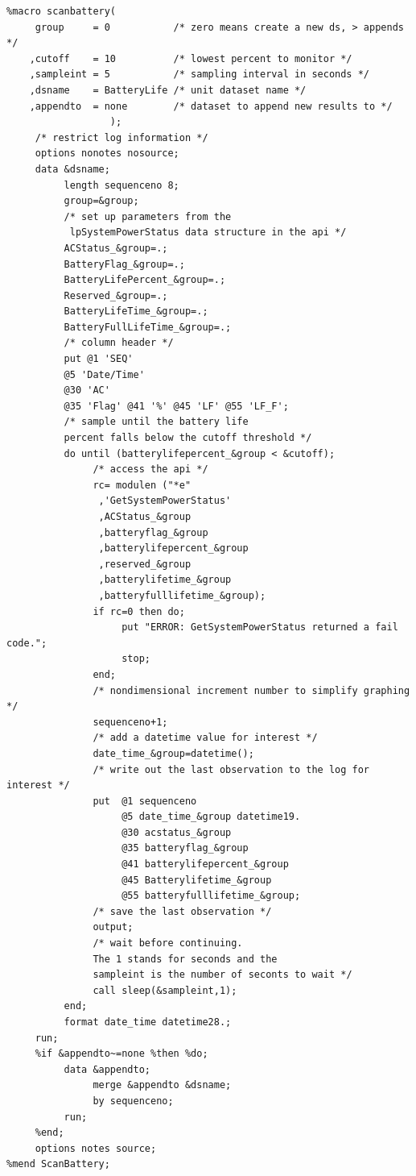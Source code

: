 \documentclass{sugconf}
\begin{document}
\begin{verbatim}
%macro scanbattery(
     group     = 0           /* zero means create a new ds, > appends */
    ,cutoff    = 10          /* lowest percent to monitor */
    ,sampleint = 5           /* sampling interval in seconds */
    ,dsname    = BatteryLife /* unit dataset name */
    ,appendto  = none        /* dataset to append new results to */
                  );
     /* restrict log information */
     options nonotes nosource;
     data &dsname;
          length sequenceno 8;
          group=&group;
          /* set up parameters from the
           lpSystemPowerStatus data structure in the api */
          ACStatus_&group=.;
          BatteryFlag_&group=.;
          BatteryLifePercent_&group=.;
          Reserved_&group=.;
          BatteryLifeTime_&group=.;
          BatteryFullLifeTime_&group=.;
          /* column header */
          put @1 'SEQ'
          @5 'Date/Time'
          @30 'AC'
          @35 'Flag' @41 '%' @45 'LF' @55 'LF_F';
          /* sample until the battery life
          percent falls below the cutoff threshold */
          do until (batterylifepercent_&group < &cutoff);
               /* access the api */
               rc= modulen ("*e"
                ,'GetSystemPowerStatus'
                ,ACStatus_&group
                ,batteryflag_&group
                ,batterylifepercent_&group
                ,reserved_&group
                ,batterylifetime_&group
                ,batteryfulllifetime_&group);
               if rc=0 then do;
                    put "ERROR: GetSystemPowerStatus returned a fail code.";
                    stop;
               end;
               /* nondimensional increment number to simplify graphing */
               sequenceno+1;
               /* add a datetime value for interest */
               date_time_&group=datetime();
               /* write out the last observation to the log for interest */
               put  @1 sequenceno
                    @5 date_time_&group datetime19.
                    @30 acstatus_&group
                    @35 batteryflag_&group
                    @41 batterylifepercent_&group
                    @45 Batterylifetime_&group
                    @55 batteryfulllifetime_&group;
               /* save the last observation */
               output;
               /* wait before continuing.
               The 1 stands for seconds and the
               sampleint is the number of seconts to wait */
               call sleep(&sampleint,1);
          end;
          format date_time datetime28.;
     run;
     %if &appendto~=none %then %do;
          data &appendto;
               merge &appendto &dsname;
               by sequenceno;
          run;
     %end;
     options notes source;
%mend ScanBattery;


\end{verbatim}
\end{document}
